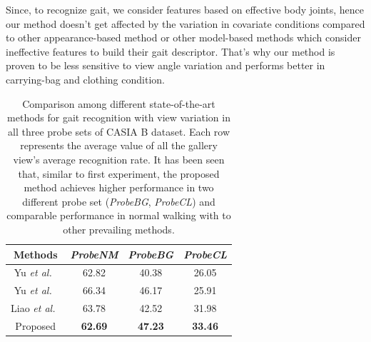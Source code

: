 Since, to recognize gait, we consider features based on effective body joints, hence our method doesn't get affected by the variation in covariate conditions compared to other appearance-based method or other model-based methods which consider ineffective features to build their gait descriptor. That’s why our method is proven to be less sensitive to view angle variation and performs better in carrying-bag and clothing condition. 

\begin{table}
	\centering
	\caption [Comparison among different state-of-the-art methods for gait recognition with view variation in all three probe sets of CASIA B dataset]
	{Comparison among different state-of-the-art methods for gait recognition with view variation in all three probe sets of CASIA B dataset. Each row represents the average value of all the gallery view's average recognition rate. It has been seen that, similar to first experiment, the proposed method achieves higher performance in two different probe set (\textit{ProbeBG}, \textit{ProbeCL}) and comparable performance in normal walking with to other prevailing methods. \label{table:comp_casia_b_with_view}}
		
	{\begin{tabular*}{22pc}{cccc}\hline
				
				Methods &\textit{ProbeNM} &\textit{ProbeBG} &\textit{ProbeCL}\\
				\hline
				
				\noalign{\smallskip}
				Yu \textit{et al.}~\cite{Yu_17_spae} &62.82 &40.38 &26.05 \\ 
				
				
				\noalign{\smallskip}
				Yu \textit{et al.}~\cite{Yu_19} &66.34  &46.17  &25.91  \\
				
				\noalign{\smallskip}
				Liao \textit{et al.}~\cite{Liao_19}  &63.78  &42.52  &31.98  \\
				
				\noalign{\smallskip}
				Proposed &\textbf{62.69} &\textbf{47.23} &\textbf{33.46}\\
				\hline
\end{tabular*}}{}
\end{table}

